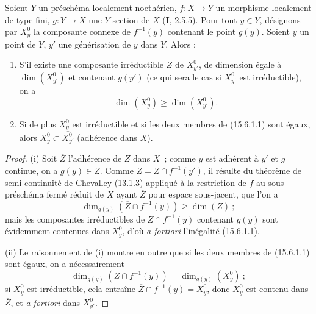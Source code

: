 \begin{proposition}[15.6.1]
\label{IV.15.6.1-fr}
Soient $Y$ un préschéma localement noethérien, $f:X\to Y$ un morphisme localement de type fini, $g:Y\to X$ une $Y$-section de $X$ (\textbf{I}, 2.5.5). Pour tout $y\in Y$, désignons par $X_y^0$ la composante connexe de $f^{-1}(y)$ contenant le point $g(y)$. Soient $y$ un point de $Y$, $y'$ une générisation de $y$ dans $Y$. Alors :
\begin{enumerate}[label=\emph{(\roman*)}]
  \item S'il existe une composante irréductible $Z$ de $X_{y'}^0$, de dimension égale à $\dim(X_{y'}^0)$ et contenant $g(y')$ (ce qui sera le cas si $X_{y'}^0$ est irréductible), on a
\begin{equation}
\tag{15.6.1.1}
\label{IV.15.6.1.1-fr}
  \dim(X_y^0)\geqslant\dim(X_{y'}^0).
\end{equation}
  \item Si de plus $X_y^0$ est irréductible et si les deux membres de (15.6.1.1) sont égaux, alors $X_y^0\subset\overline{X_{y'}^0}$ (adhérence dans $X$).
\end{enumerate}
\end{proposition}

\begin{proof}
(i) Soit $\overline Z$ l'adhérence de $Z$ dans $X$~; comme $y$ est adhérent à $y'$ et $g$ continue, on a $g(y)\in\overline Z$. Comme $Z=\overline Z\cap f^{-1}(y')$, il résulte du théorème de semi-continuité de Chevalley (13.1.3) appliqué à la restriction de $f$ au sous-préschéma fermé réduit de $X$ ayant $\overline Z$ pour espace sous-jacent, que l'on a
\[
  \dim_{g(y)}(\overline Z\cap f^{-1}(y))\geqslant\dim(Z)~;
\]
mais les composantes irréductibles de $\overline Z\cap f^{-1}(y)$ contenant $g(y)$ sont évidemment contenues dans $X_y^0$, d'où \emph{a fortiori} l'inégalité (15.6.1.1).

(ii) Le raisonnement de (i) montre en outre que si les deux membres de (15.6.1.1) sont égaux, on a nécessairement
\[
  \dim_{g(y)}(\overline Z\cap f^{-1}(y))=\dim_{g(y)}(X_y^0)~;
\]
si $X_y^0$ est irréductible, cela entraîne $\overline Z\cap f^{-1}(y)=X_y^0$, donc $X_y^0$ est contenu dans $\overline Z$, et \emph{a fortiori} dans $\overline{X_{y'}^0}$.
\end{proof}

